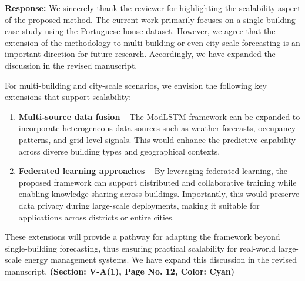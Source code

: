 \documentclass[12pt]{article}
\begin{document}

\textbf{Response:}  We sincerely thank the reviewer for highlighting the scalability aspect of the proposed method. The current work primarily focuses on a single-building case study using the Portuguese house dataset. However, we agree that the extension of the methodology to multi-building or even city-scale forecasting is an important direction for future research. Accordingly, we have expanded the discussion in the revised manuscript.  

For multi-building and city-scale scenarios, we envision the following key extensions that support scalability:  

\begin{enumerate}
    \item \textbf{Multi-source data fusion} -- The ModLSTM framework can be expanded to incorporate heterogeneous data sources such as weather forecasts, occupancy patterns, and grid-level signals. This would enhance the predictive capability across diverse building types and geographical contexts.  

    \item \textbf{Federated learning approaches} -- By leveraging federated learning, the proposed framework can support distributed and collaborative training while enabling knowledge sharing across buildings. Importantly, this would preserve data privacy during large-scale deployments, making it suitable for applications across districts or entire cities.  
\end{enumerate}

These extensions will provide a pathway for adapting the framework beyond single-building forecasting, thus ensuring practical scalability for real-world large-scale energy management systems. We have expand this discussion in the revised manuscript. \textbf{(Section: V-A(1), Page No. 12, Color: Cyan)}
\newline
\end{document}
